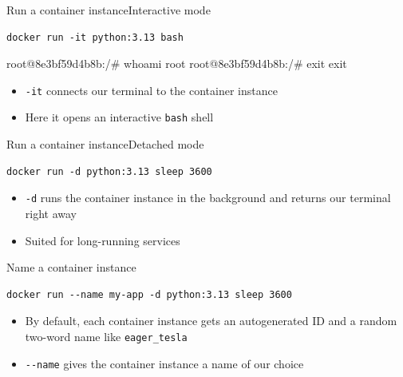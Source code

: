 \documentclass[aspectratio=169]{beamer}
\begin{document}
\begin{frame}[fragile]{Run a container instance}{Interactive mode}
  \begin{verbatim}
docker run -it python:3.13 bash
  \end{verbatim}
  \begin{cmdoutput}
root@8e3bf59d4b8b:/# whoami
root
root@8e3bf59d4b8b:/# exit
exit
  \end{cmdoutput}

  \begin{itemize}
    \item \texttt{-it} connects our terminal to the container instance
    \item Here it opens an interactive \texttt{bash} shell
  \end{itemize}

\note{
}
\end{frame}


\begin{frame}[fragile]{Run a container instance}{Detached mode}
  \begin{verbatim}
docker run -d python:3.13 sleep 3600
  \end{verbatim}

  \begin{itemize}
    \item \texttt{-d} runs the container instance in the background and returns our terminal right away
    \item Suited for long-running services
  \end{itemize}

\note{
}
\end{frame}


\begin{frame}[fragile]{Name a container instance}
  \begin{verbatim}
docker run --name my-app -d python:3.13 sleep 3600
  \end{verbatim}

  \begin{itemize}
    \item By default, each container instance gets an autogenerated ID and a random two-word name like \texttt{eager\_tesla}
    \item \texttt{-{}-name} gives the container instance a name of our choice
  \end{itemize}

\note{
}
\end{frame}
\end{document}
